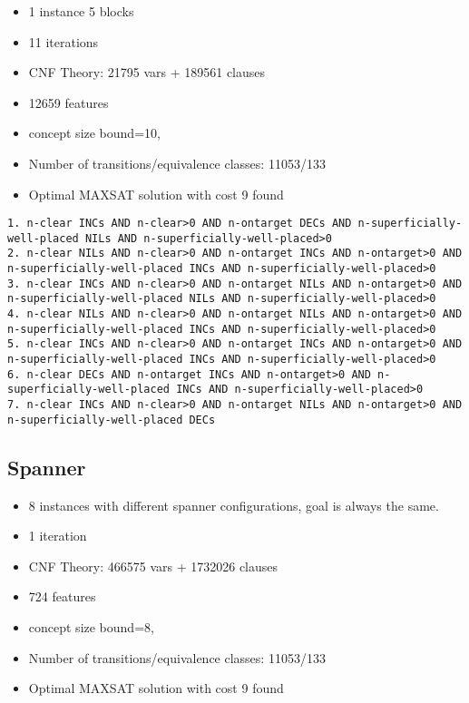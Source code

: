 \documentclass[a4paper]{article}
\begin{document}
\begin{itemize}
 \item 1 instance 5 blocks
 \item 11 iterations
 \item CNF Theory: 21795 vars + 189561 clauses
 \item 12659 features
 \item concept size bound=10,
 \item Number of transitions/equivalence classes: 11053/133
 \item Optimal MAXSAT solution with cost 9 found
\end{itemize}


\begin{Verbatim}[fontsize=\footnotesize]
1. n-clear INCs AND n-clear>0 AND n-ontarget DECs AND n-superficially-well-placed NILs AND n-superficially-well-placed>0
2. n-clear NILs AND n-clear>0 AND n-ontarget INCs AND n-ontarget>0 AND n-superficially-well-placed INCs AND n-superficially-well-placed>0
3. n-clear INCs AND n-clear>0 AND n-ontarget NILs AND n-ontarget>0 AND n-superficially-well-placed NILs AND n-superficially-well-placed>0
4. n-clear NILs AND n-clear>0 AND n-ontarget NILs AND n-ontarget>0 AND n-superficially-well-placed INCs AND n-superficially-well-placed>0
5. n-clear INCs AND n-clear>0 AND n-ontarget INCs AND n-ontarget>0 AND n-superficially-well-placed INCs AND n-superficially-well-placed>0
6. n-clear DECs AND n-ontarget INCs AND n-ontarget>0 AND n-superficially-well-placed INCs AND n-superficially-well-placed>0
7. n-clear INCs AND n-clear>0 AND n-ontarget NILs AND n-ontarget>0 AND n-superficially-well-placed DECs
\end{Verbatim}



\subsection{Spanner}

\begin{itemize}
 \item 8 instances with different spanner configurations, goal is always the same.
 \item 1 iteration
 \item CNF Theory: 466575 vars + 1732026 clauses
 \item 724 features
 \item concept size bound=8,
 \item Number of transitions/equivalence classes: 11053/133
 \item Optimal MAXSAT solution with cost 9 found
\end{itemize}
\end{document}
